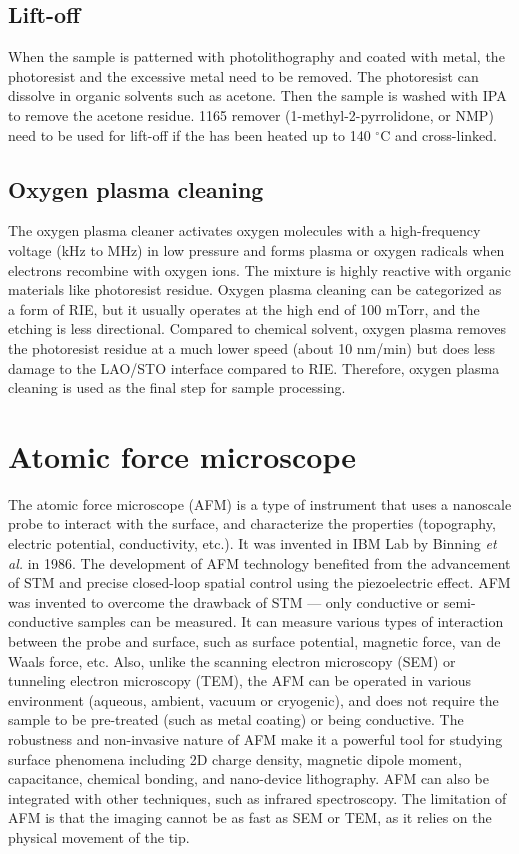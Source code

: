 \documentclass[pdflatex, sectionletters, 12pt, final, phd]{pittetd}    %
\begin{document}
\subsection{Lift-off}

When the sample is patterned with photolithography and coated with metal, the photoresist and the excessive metal need to be removed. The photoresist can dissolve in organic solvents such as acetone. Then the sample is washed with IPA to remove the acetone residue. 1165 remover (1-methyl-2-pyrrolidone, or NMP) need to be used for lift-off if the has been heated up to 140 $^{\circ}$C and cross-linked.

\subsection{Oxygen plasma cleaning}

The oxygen plasma cleaner activates oxygen molecules with a high-frequency voltage (kHz to MHz) in low pressure and forms plasma or oxygen radicals when electrons recombine with oxygen ions. The mixture is highly reactive with organic materials like photoresist residue. Oxygen plasma cleaning can be categorized as a form of RIE, but it usually operates at the high end of 100 mTorr, and the etching is less directional. Compared to chemical solvent, oxygen plasma removes the photoresist residue at a much lower speed (about 10 nm/min) but does less damage to the LAO/STO interface compared to RIE. Therefore, oxygen plasma cleaning is used as the final step for sample processing.

\section{Atomic force microscope}
\label{SEC:AFM}

The atomic force microscope (AFM) is a type of instrument that uses a nanoscale probe to interact with the surface, and characterize the properties (topography, electric potential, conductivity, etc.). It was invented in IBM Lab by Binning \textit{et al.} \cite{binning1986atomic} in 1986. The development of AFM technology benefited from the advancement of STM and precise closed-loop spatial control using the piezoelectric effect. AFM was invented to overcome the drawback of STM --- only conductive or semi-conductive samples can be measured. It can measure various types of interaction between the probe and surface, such as surface potential, magnetic force, van de Waals force, etc. Also, unlike the scanning electron microscopy (SEM) or tunneling electron microscopy (TEM), the AFM can be operated in various environment (aqueous, ambient, vacuum or cryogenic), and does not require the sample to be pre-treated (such as metal coating) or being conductive. The robustness and non-invasive nature of AFM make it a powerful tool for studying surface phenomena including 2D charge density, magnetic dipole moment, capacitance, chemical bonding, and nano-device lithography. AFM can also be integrated with other techniques, such as infrared spectroscopy\cite{hammiche1999photothermal, pollock2006handbook}. The limitation of AFM is that the imaging cannot be as fast as SEM or TEM, as it relies on the physical movement of the tip.
\end{document}
